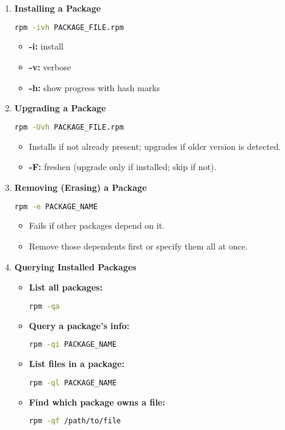 \documentclass[a4paper]{report}
\begin{document}
\begin{enumerate}
    \item \textbf{Installing a Package}
\begin{lstlisting}[language=bash]
rpm -ivh PACKAGE_FILE.rpm
\end{lstlisting}
\begin{itemize}
    \item \textbf{-i:} install
    \item \textbf{-v:} verbose
    \item \textbf{-h:} show progress with hash marks
\end{itemize}

\item \textbf{Upgrading a Package}
\begin{lstlisting}[language=bash]
rpm -Uvh PACKAGE_FILE.rpm
\end{lstlisting}
\begin{itemize}
    \item Installs if not already present; upgrades if older version is detected.
    \item \textbf{-F:} freshen (upgrade only if installed; skip if not).
\end{itemize}

\item \textbf{Removing (Erasing) a Package}
\begin{lstlisting}[language=bash]
rpm -e PACKAGE_NAME
\end{lstlisting}
\begin{itemize}
    \item Fails if other packages depend on it.
    \item Remove those dependents first or specify them all at once.
\end{itemize}

\item \textbf{Querying Installed Packages}
\begin{itemize}
    \item \textbf{List all packages:}
    \begin{lstlisting}[language=bash]
rpm -qa
    \end{lstlisting}
    \item \textbf{Query a package’s info:}
    \begin{lstlisting}[language=bash]
rpm -qi PACKAGE_NAME
    \end{lstlisting}
    \item \textbf{List files in a package:}
    \begin{lstlisting}[language=bash]
rpm -ql PACKAGE_NAME
    \end{lstlisting}
    \item \textbf{Find which package owns a file:}
    \begin{lstlisting}[language=bash]
rpm -qf /path/to/file
    \end{lstlisting}
\end{itemize}


\end{enumerate}
\end{document}
